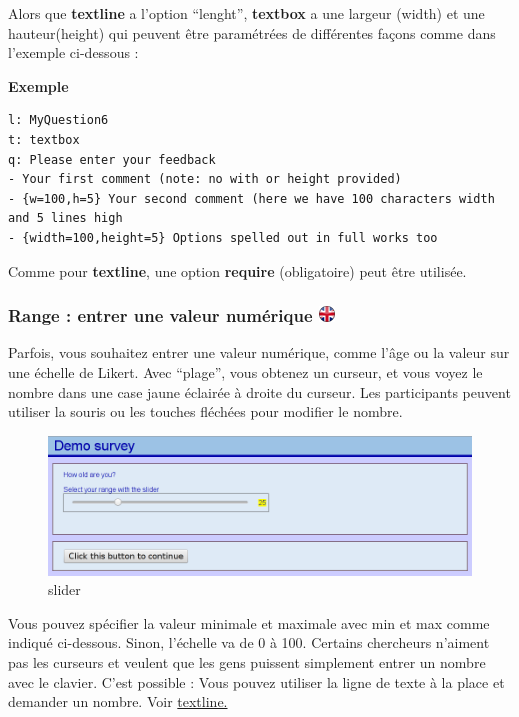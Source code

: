 \documentclass[
]{book}
\begin{document}
Alors que \textbf{textline} a l'option ``lenght'', \textbf{textbox} a
une largeur (width) et une hauteur(height) qui peuvent être paramétrées
de différentes façons comme dans l'exemple ci-dessous :

\textbf{Exemple}

\begin{verbatim}
l: MyQuestion6
t: textbox
q: Please enter your feedback
- Your first comment (note: no with or height provided)
- {w=100,h=5} Your second comment (here we have 100 characters width and 5 lines high
- {width=100,height=5} Options spelled out in full works too
\end{verbatim}

Comme pour \textbf{textline}, une option \textbf{require} (obligatoire)
peut être utilisée.

\hypertarget{range-entrer-une-valeur-numuxe9rique}{%
\subsubsection[Range : entrer une valeur numérique
]{\texorpdfstring{Range : entrer une valeur numérique
\href{https://www.psytoolkit.org/doc3.2.0/online-survey-syntax.html\#range}{\protect\includegraphics{img/ukflag.png}}}{Range : entrer une valeur numérique }}\label{range-entrer-une-valeur-numuxe9rique}}

Parfois, vous souhaitez entrer une valeur numérique, comme l'âge ou la
valeur sur une échelle de Likert. Avec ``plage'', vous obtenez un
curseur, et vous voyez le nombre dans une case jaune éclairée à droite
du curseur. Les participants peuvent utiliser la souris ou les touches
fléchées pour modifier le nombre.

\begin{figure}
\centering
\includegraphics{img/slider.png}
\caption{slider}
\end{figure}

Vous pouvez spécifier la valeur minimale et maximale avec min et max
comme indiqué ci-dessous. Sinon, l'échelle va de 0 à 100. Certains
chercheurs n'aiment pas les curseurs et veulent que les gens puissent
simplement entrer un nombre avec le clavier. C'est possible : Vous
pouvez utiliser la ligne de texte à la place et demander un nombre. Voir
\protect\hyperlink{textline}{textline.}
\end{document}
